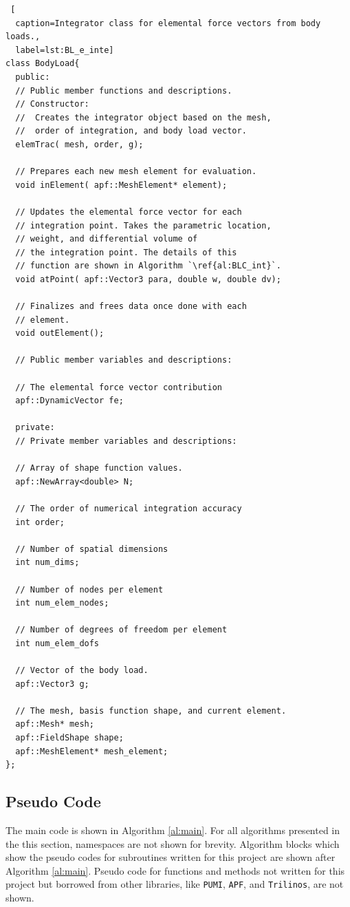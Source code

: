 \documentclass[a4paper, 12pt]{article}
\begin{document}
\begin{lstlisting} [
  caption=Integrator class for elemental force vectors from body loads.,
  label=lst:BL_e_inte]
class BodyLoad{
  public:
  // Public member functions and descriptions.
  // Constructor:
  //  Creates the integrator object based on the mesh,
  //  order of integration, and body load vector.
  elemTrac( mesh, order, g);

  // Prepares each new mesh element for evaluation.
  void inElement( apf::MeshElement* element);

  // Updates the elemental force vector for each
  // integration point. Takes the parametric location,
  // weight, and differential volume of
  // the integration point. The details of this
  // function are shown in Algorithm `\ref{al:BLC_int}`.
  void atPoint( apf::Vector3 para, double w, double dv);

  // Finalizes and frees data once done with each
  // element.
  void outElement();

  // Public member variables and descriptions:

  // The elemental force vector contribution
  apf::DynamicVector fe;

  private:
  // Private member variables and descriptions:

  // Array of shape function values.
  apf::NewArray<double> N;

  // The order of numerical integration accuracy
  int order;

  // Number of spatial dimensions
  int num_dims;

  // Number of nodes per element
  int num_elem_nodes;

  // Number of degrees of freedom per element
  int num_elem_dofs

  // Vector of the body load.
  apf::Vector3 g;

  // The mesh, basis function shape, and current element.
  apf::Mesh* mesh;
  apf::FieldShape shape;
  apf::MeshElement* mesh_element;
};

\end{lstlisting}
\vspace{\baselineskip}

\subsection{Pseudo Code} \label{subsec:pseudo}
The main code is shown in Algorithm \ref{al:main}. For all
algorithms presented in the this section, namespaces
are not shown for brevity. Algorithm blocks which
show the pseudo codes for subroutines written for this
project are shown after Algorithm \ref{al:main}.
Pseudo code for functions and methods not written for this
project but borrowed from other libraries, like \texttt{PUMI},
\texttt{APF}, and \texttt{Trilinos}, are not shown.
\end{document}
